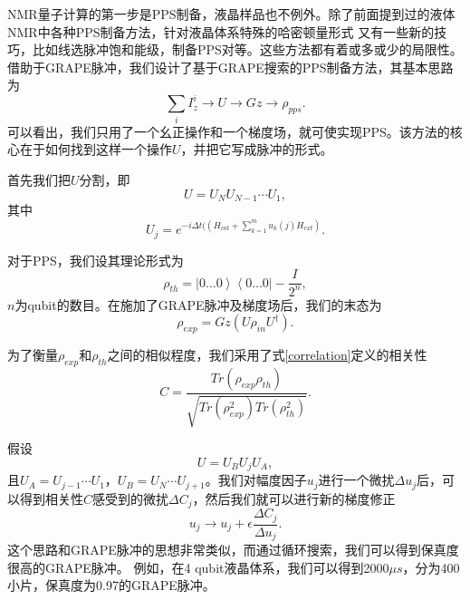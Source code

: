 NMR量子计算的第一步是PPS制备，液晶样品也不例外。除了前面提到过的液体NMR中各种PPS制备方法，针对液晶体系特殊的哈密顿量形式
又有一些新的技巧，比如线选脉冲饱和能级\cite{lq3}，制备PPS对\cite{lq4,lq5,lq6}等。这些方法都有着或多或少的局限性。
借助于GRAPE脉冲，我们设计了基于GRAPE搜索的PPS制备方法，其基本思路为
\begin{equation}\label{aaa}
\sum_i I^i_z \rightarrow U\rightarrow Gz \rightarrow\rho_{pps}.
\end{equation}
可以看出，我们只用了一个幺正操作和一个梯度场，就可使实现PPS。该方法的核心在于如何找到这样一个操作$U$，并把它写成脉冲的形式。

首先我们把$U$分割，即
\begin{equation}\label{aaa}
U = U_N U_{N-1}\cdots U_1,
\end{equation}
其中
\begin{equation}\label{aaa}
U_j = e^{-i\Delta t ((H_{int} + \sum_{k=1}^mu_k(j)H_{ext})}.
\end{equation}

对于PPS，我们设其理论形式为
\begin{equation}\label{aaa}
\rho_{th} = \left \vert 0\ldots 0 \right \rangle \left \langle 0\ldots 0 \right \vert - \frac{I}{2^n},
\end{equation}
$n$为qubit的数目。在施加了GRAPE脉冲及梯度场后，我们的末态为
\begin{equation}\label{aaa}
\rho_{exp} = Gz(U \rho_{in} U^{\dagger}).
\end{equation}

为了衡量$\rho_{exp} $和$\rho_{th}$之间的相似程度，我们采用了式\ref{correlation}定义的相关性
\begin{equation}\label{correlation}
C = \frac{Tr(\rho_{exp} \rho_{th})}{\sqrt{Tr(\rho_{exp}^2)Tr(\rho_{th}^2)}}.
\end{equation}

假设
\begin{equation}\label{aaa}
U = U_B U_{j} U_A,
\end{equation}
且$U_A = U_{j-1}\cdots U_1$，$U_B = U_N\cdots U_{j+1}$。我们对幅度因子$u_j$进行一个微扰$\Delta u_j$后，可以得到相关性$C$感受到的微扰$\Delta C_j$，然后我们就可以进行新的梯度修正
\begin{equation}\label{aaa}
u_j \rightarrow u_j + \epsilon \frac{\Delta C_j}{\Delta u_j}.
\end{equation}
这个思路和GRAPE脉冲的思想非常类似，而通过循环搜索，我们可以得到保真度很高的GRAPE脉冲。
例如，在4 qubit液晶体系，我们可以得到2000$\mu s$，分为400小片，保真度为0.97的GRAPE脉冲。

